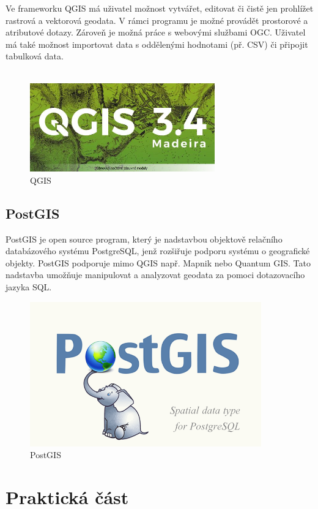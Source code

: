 \documentclass[a4paper, 12pt]{article}
\begin{document}
Ve frameworku QGIS má uživatel možnost vytvářet, editovat či čistě jen prohlížet rastrová a vektorová geodata. V rámci programu je možné provádět prostorové a atributové dotazy. Zároveň je možná práce s webovými službami OGC. Uživatel má také možnost importovat data s oddělenými hodnotami (př. CSV) či připojit tabulková data.\\
\\

\begin{figure}[h!]
	\centering
	\includegraphics[width=8cm]{pictures/qgis.jpg}
	\caption{QGIS}
\end{figure}

\subsection{PostGIS}
PostGIS je open source program, který je nadstavbou objektově relačního databázového systému PostgreSQL, jenž rozšiřuje podporu systému o geografické objekty. PostGIS podporuje mimo QGIS např. Mapnik nebo Quantum GIS. Tato nadstavba umožňuje manipulovat a analyzovat geodata za pomoci dotazovacího jazyka SQL. 

\begin{figure}[h!]
	\centering
	\includegraphics[width=10cm]{pictures/postgis.png}
	\caption{PostGIS}
\end{figure}


\section{Praktická část}
\end{document}
